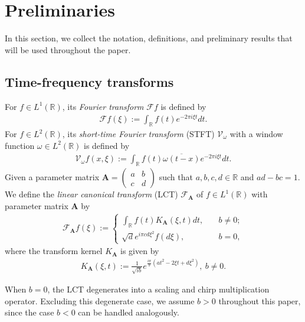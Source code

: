 \documentclass[11pt, reqno]{amsart}
\newcommand{\R}{\mathbb{R}}
\numberwithin{equation}{section}
\begin{document}
    \section{Preliminaries}\label{prelim.sec}


\medskip 


In this section, we collect the notation, definitions, and preliminary results that will be used throughout the paper.


\subsection{Time-frequency transforms}

For $f \in L^1 (\R)$, its \emph{Fourier transform} $\mathcal{F} f $ is defined by
	\begin{align*}
		\mathcal{F} f (\xi)  := \int_{\R} f(t) e^{- 2 \pi i \xi t} dt.
	\end{align*}
	For $f \in L^2 (\R)$, its \emph{short-time Fourier transform} (STFT) $\mathcal{V}_\omega$ with a window function $\omega \in L^2 (\R)$ is defined by
	\begin{align*}
		\mathcal{V}_\omega f (x , \xi) := \int_{\R} f(t) \overline{\omega(t - x)} e^{- 2 \pi i \xi t} dt.
	\end{align*}
	Given a parameter matrix $\mathbf{A} = 
	\begin{pmatrix}
		a & b \\
		c & d
	\end{pmatrix}
	$
	such that $a, b, c, d \in \R$ and $ad - bc = 1$. We define the \emph{linear canonical transform} (LCT) \cite{healy2016linear, xu2013linear} $\mathcal{F}_{\textbf{A}}$ of $f \in L^1(\R)$ with parameter matrix \textbf{A} by
	\begin{align*}
		\mathcal{F}_{\textbf{A}} f (\xi) := \left\{
		\begin{array}{ll}
			\int_{\R} f(t) K_{\textbf{A}} (\xi , t) dt, \quad &  b \ne 0; \\
			\sqrt{d} e^{i \pi cd  \xi^2} f(d\xi), \quad & b = 0,
		\end{array}
		\right.
	\end{align*}
	where the transform kernel $K_{\textbf{A}}$ is given by
	\begin{align}\label{eq12}
		K_{\textbf{A}} (\xi , t) := \frac{1}{\sqrt{i b}} e^{\frac{i \pi}{b} (a t^2 - 2\xi t + d\xi^2)}, \ b \ne 0.
	\end{align}

	When $b = 0$, the LCT degenerates into a scaling and chirp multiplication operator. Excluding this degenerate  case,  we assume $b > 0$ throughout this paper, since the case $b<0$ can be handled analogously.
\end{document}
